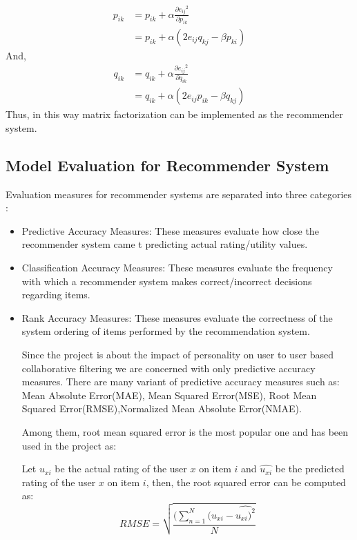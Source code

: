 \begin{equation}
\begin{split}
	p_{ik} &= p_{ik} + \alpha \frac{\partial {e_{ij}}^2}{\partial p_{ik}} \\
	& = p_{ik}  + \alpha (2e_{ij} q_{kj} - \beta p_{ki})
\end{split}
\end{equation}
And,
\begin{equation}
\begin{split}
	q_{ik} &= q_{ik} + \alpha \frac{\partial {e_{ij}}^2}{\partial q_{ik}} \\
	& = q_{ik}  + \alpha (2e_{ij} p_{ik} - \beta q_{kj})
\end{split}
\end{equation}
Thus, in this way matrix factorization can be implemented as the recommender system.
\subsection{Model Evaluation for Recommender System}
Evaluation measures for recommender systems are separated into three categories \cite{eval}:
\begin{itemize}
	\item Predictive Accuracy Measures: These measures evaluate how close the recommender system came t predicting actual rating/utility values.
	\item Classification Accuracy Measures: These measures evaluate the frequency with which a recommender system makes correct/incorrect decisions regarding items.
	\item Rank Accuracy Measures: These measures evaluate the correctness of the system ordering of items performed by the recommendation system.

	Since the project is about the impact of personality on user to user based collaborative filtering we are concerned with only predictive accuracy measures. There are many variant of predictive accuracy measures such as: Mean Absolute Error(MAE), Mean Squared Error(MSE), Root Mean Squared Error(RMSE),Normalized Mean Absolute Error(NMAE).

Among them, root mean squared error is the most popular one and has been used in the project as:

Let $u_{xi}$ be the actual rating of the user $x$ on item $i$ and $\widehat{u_{xi}}$ be the predicted rating of the user $x$ on item $i$, then, the root squared error can be computed as:
\begin{equation}
	RMSE = \sqrt{\frac{(\sum_{n=1}^N(u_{xi}-\widehat{u_{xi})^2}}{N}}
\end{equation}
\end{itemize}
